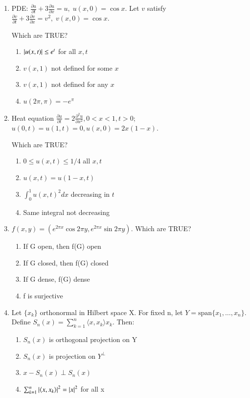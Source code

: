 \documentclass[journal,12pt,onecolumn]{IEEEtran}
\theoremstyle{remark}
\begin{document}
\begin{enumerate}
\item PDE: $\tfrac{\partial u}{\partial t}+3\tfrac{\partial u}{\partial x}=u, \; u(x,0)=\cos x$. Let $v$ satisfy $\tfrac{\partial v}{\partial t}+3\tfrac{\partial v}{\partial x}=v^2, \; v(x,0)=\cos x$.  

Which are TRUE?  

\begin{enumerate}
\item $\left\vert u(x,t)\right\vert\leq e^t$ for all $x,t$
\item $v(x,1)$ not defined for some $x$
\item $v(x,1)$ not defined for any $x$
\item $u(2\pi,\pi)=-e^\pi$
\end{enumerate}
\hfill{}

\item Heat equation $\tfrac{\partial u}{\partial t}=2\tfrac{\partial^2 u}{\partial x^2}, 0<x<1,t>0$; $u(0,t)=u(1,t)=0, u(x,0)=2x(1-x)$.  

Which are TRUE?  

\begin{enumerate}
\item $0\leq u(x,t)\leq 1/4$ all $x,t$
\item $u(x,t)=u(1-x,t)$
\item $\int_0^1 u(x,t)^2dx$ decreasing in $t$
\item Same integral not decreasing
\end{enumerate}
\hfill{}

\item $f(x,y)=(e^{2\pi x}\cos 2\pi y, e^{2\pi x}\sin 2\pi y)$. Which are TRUE?  

\begin{enumerate}
\item If G open, then f(G) open
\item If G closed, then f(G) closed
\item If G dense, f(G) dense
\item f is surjective
\end{enumerate}
\hfill{}

\item Let $\{x_k\}$ orthonormal in Hilbert space X. For fixed n, let $Y=\text{span}\{x_1,\dots,x_n\}$. Define $S_n(x)=\sum_{k=1}^n \langle x,x_k\rangle x_k$. Then:  

\begin{enumerate}
\item $S_n(x)$ is orthogonal projection on Y
\item $S_n(x)$ is projection on $Y^\perp$
\item $x-S_n(x)\perp S_n(x)$
\item $\sum_{k=1}^n\left\vert\langle x,x_k\rangle\right\vert^2=\left\vert x\right\vert^2$ for all x
\end{enumerate}
\hfill{}


\end{enumerate}
\end{document}
